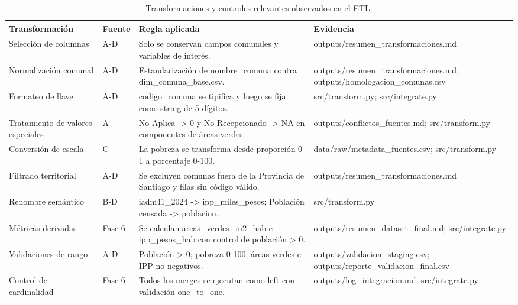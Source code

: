 \begin{table}[htbp]
\centering
\footnotesize
\caption{Transformaciones y controles relevantes observados en el ETL.}
\begin{tabular}{|p{2.7cm}|p{1.2cm}|p{7.0cm}|p{3.5cm}|}
\hline
Transformación & Fuente & Regla aplicada & Evidencia \\
\hline
Selección de columnas & A-D & Solo se conservan campos comunales y variables de interés. & outputs/resumen\_transformaciones.md \\
Normalización comunal & A-D & Estandarización de nombre\_comuna contra dim\_comuna\_base.csv. & outputs/resumen\_transformaciones.md; outputs/homologacion\_comunas.csv \\
Formateo de llave & A-D & codigo\_comuna se tipifica y luego se fija como string de 5 dígitos. & src/transform.py; src/integrate.py \\
Tratamiento de valores especiales & A & No Aplica -> 0 y No Recepcionado -> NA en componentes de áreas verdes. & outputs/conflictos\_fuentes.md; src/transform.py \\
Conversión de escala & C & La pobreza se transforma desde proporción 0-1 a porcentaje 0-100. & data/raw/metadata\_fuentes.csv; src/transform.py \\
Filtrado territorial & A-D & Se excluyen comunas fuera de la Provincia de Santiago y filas sin código válido. & outputs/resumen\_transformaciones.md \\
Renombre semántico & B-D & iadm41\_2024 -> ipp\_miles\_pesos; Población censada -> poblacion. & src/transform.py \\
Métricas derivadas & Fase 6 & Se calculan areas\_verdes\_m2\_hab e ipp\_pesos\_hab con control de población > 0. & outputs/resumen\_dataset\_final.md; src/integrate.py \\
Validaciones de rango & A-D & Población > 0; pobreza 0-100; áreas verdes e IPP no negativos. & outputs/validacion\_staging.csv; outputs/reporte\_validacion\_final.csv \\
Control de cardinalidad & Fase 6 & Todos los merges se ejecutan como left con validación one\_to\_one. & outputs/log\_integracion.md; src/integrate.py \\
\hline
\end{tabular}
\end{table}
